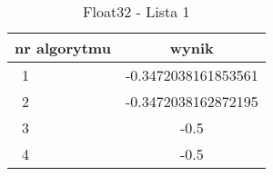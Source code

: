 \begin{table}[t]
    \caption{Float32 - Lista 1}
    \label{vectors1}
    \centering
    \begin{tabular}{|l|c|}
        \hline 
        \textbf{nr algorytmu} & \textbf{wynik} \\
        \hline
        \ 1 & -0.3472038161853561\\
        \hline
        \ 2 & -0.3472038162872195\\
        \hline
        \ 3 & -0.5\\
        \hline
        \ 4 & -0.5\\
        \hline
    \end{tabular} 
\end{table}

